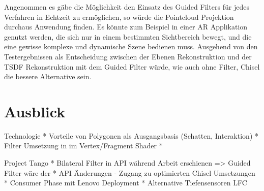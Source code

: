 Angenommen es gäbe die Möglichkeit den Einsatz des Guided Filters für jedes Verfahren in Echtzeit zu ermöglichen, so würde die Pointcloud Projektion durchaus Anwendung finden. Es könnte zum Beispiel in einer AR Applikation genutzt werden, die sich nur in einem bestimmten Sichtbereich bewegt, und die eine gewisse komplexe und dynamische Szene bedienen muss. Ausgehend von den Testergebnissen als Entscheidung zwischen der Ebenen Rekonstruktion und der TSDF Rekonstruktion mit dem Guided Filter würde, wie auch ohne Filter, Chisel die bessere Alternative sein.


\section{Ausblick}



Technologie
* Vorteile von Polygonen als Ausgangsbasis (Schatten, Interaktion)
* Filter Umsetzung in im Vertex/Fragment Shader
* 

Project Tango
* Bilateral Filter in API während Arbeit erschienen => Guided Filter wäre der
* API Änderungen - Zugang zu optimierten Chisel Umsetzungen
* Consumer Phase mit Lenovo Deployment
* Alternative Tiefensensoren LFC


	
	